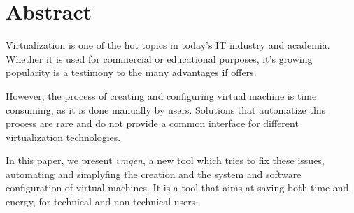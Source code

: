 \begingroup
\let\clearpage\relax
\let\cleardoublepage\relax
\let\cleardoublepage\relax

\chapter*{Abstract}

Virtualization is one of the hot topics in today's IT industry and academia. 
Whether it is used for commercial or educational purposes, it's growing 
popularity is a testimony to the many advantages if offers.

However, the process of creating and configuring virtual machine is time 
consuming, as it is done manually by users. Solutions that automatize this 
process are rare and do not provide a common interface for different 
virtualization technologies.

In this paper, we present \emph{vmgen}, a new tool which tries to fix 
these issues, automating and simplyfing the creation and the system and 
software configuration of virtual machines. It is a tool that aims at saving 
both time and energy, for technical and non-technical users.

\endgroup

\vfill
